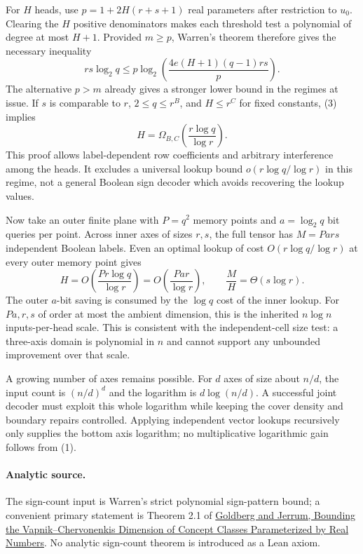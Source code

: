 \documentclass[11pt]{article}
\begin{document}
For $H$ heads, use $p=1+2H(r+s+1)$ real parameters after restriction to
$u_0$. Clearing the $H$ positive denominators makes each threshold test a
polynomial of degree at most $H+1$. Provided $m\geq p$, Warren's theorem
therefore gives the necessary inequality
\[
 rs\log_2q\leq p\log_2\left(\frac{4e(H+1)(q-1)rs}{p}\right).
 \tag{3}
\]
The alternative $p>m$ already gives a stronger lower bound in the regimes
at issue. If $s$ is comparable to $r$, $2\leq q\leq r^B$, and
$H\leq r^C$ for fixed constants, (3) implies
\[
 H=\Omega_{B,C}\left(\frac{r\log q}{\log r}\right).
 \tag{4}
\]
This proof allows label-dependent row coefficients and arbitrary
interference among the heads. It excludes a universal lookup bound
$o(r\log q/\log r)$ in this regime, not a general Boolean sign decoder
which avoids recovering the lookup values.

Now take an outer finite plane with $P=q^2$ memory points and
$a=\log_2q$ bit queries per point. Across inner axes of sizes $r,s$, the
full tensor has $M=P a r s$ independent Boolean labels. Even an optimal
lookup of cost $O(r\log q/\log r)$ at every outer memory point gives
\[
 H=O\left(\frac{P r\log q}{\log r}\right)
   =O\left(\frac{P a r}{\log r}\right),\qquad
 \frac{M}{H}=\Theta(s\log r).
 \tag{5}
\]
The outer $a$-bit saving is consumed by the $\log q$ cost of the inner
lookup. For $P a,r,s$ of order at most the ambient dimension, this is the
inherited $n\log n$ inputs-per-head scale. This is consistent with the
independent-cell size test: a three-axis domain is polynomial in $n$ and
cannot support any unbounded improvement over that scale.

A growing number of axes remains possible. For $d$ axes of size about
$n/d$, the input count is $(n/d)^d$ and the logarithm is
$d\log(n/d)$. A successful joint decoder must exploit this whole
logarithm while keeping the cover density and boundary repairs controlled.
Applying independent vector lookups recursively only supplies the bottom
axis logarithm; no multiplicative logarithmic gain follows from (1).

\paragraph{Analytic source.}
The sign-count input is Warren's strict polynomial sign-pattern bound;
a convenient primary statement is Theorem 2.1 of
\href{https://www.cs.ox.ac.uk/people/paul.goldberg/papers/goldbergjerrum.pdf}
{Goldberg and Jerrum, Bounding the Vapnik--Chervonenkis Dimension of
Concept Classes Parameterized by Real Numbers}.
No analytic sign-count theorem is introduced as a Lean axiom.
\end{document}
